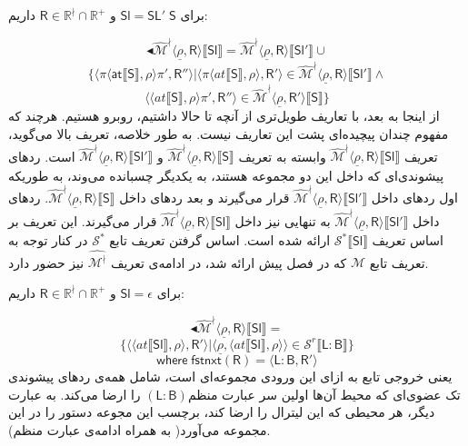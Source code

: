 برای $\mathsf{Sl=SL' \; S}$ و $\mathsf{R} \in \mathbb{R^\nmid} \cap \mathbb{R^+}$ داریم:

$$\blacktriangleleft\mathcal{\hat{M}^\nmid} \langle \underline{\rho}, \mathsf{R} \rangle \llbracket \mathsf{Sl} \rrbracket
=
\mathcal{\hat{M}^\nmid} \langle \underline{\rho}, \mathsf{R} \rangle \llbracket \mathsf{Sl'} \rrbracket
\cup$$ 
$$\{ \langle \pi \langle \mathsf{at}\llbracket \mathsf{S} \rrbracket, \rho \rangle \pi'
, \mathsf{R''} \rangle | \langle \pi \langle at \llbracket \mathsf{S}\rrbracket, \rho \rangle, \mathsf{R'} \rangle \in \mathcal{\hat{M}^\nmid}  \langle \underline{\rho} , \mathsf{R} \rangle \llbracket \mathsf{Sl'} \rrbracket\land$$
 $$\langle \langle at \llbracket \mathsf{S}\rrbracket , \rho \rangle \pi' , \mathsf{R''} \rangle \in \mathcal{\hat{M}^\nmid}
\langle \underline{\rho},\mathsf{R'} \rangle   \llbracket \mathsf{S} \rrbracket
 \}$$
از اینجا به بعد، با تعاریف طویل‌تری از آنچه تا حالا داشتیم، روبرو هستیم. هرچند که مفهوم چندان پیچیده‌ای پشت این تعاریف نیست. به ‌طور خلاصه، تعریف بالا می‌گوید، تعریف 
$\mathcal{\hat{M}^\nmid} \langle \underline{\rho}, \mathsf{R} \rangle \llbracket \mathsf{Sl} \rrbracket$
وابسته به تعریف 
$\mathcal{\hat{M}^\nmid} \langle \underline{\rho}, \mathsf{R} \rangle \llbracket \mathsf{S} \rrbracket$
و
$\mathcal{\hat{M}^\nmid} \langle \underline{\rho}, \mathsf{R} \rangle \llbracket \mathsf{Sl'} \rrbracket$
است. ردهای پیشوندی‌ای که داخل این دو مجموعه هستند، به یکدیگر چسبانده می‌وند، به‌ طوریکه اول ردهای داخل 
$\mathcal{\hat{M}^\nmid} \langle \underline{\rho}, \mathsf{R} \rangle \llbracket \mathsf{Sl'} \rrbracket$
قرار می‌گیرند و بعد ردهای داخل 
$\mathcal{\hat{M}^\nmid} \langle \underline{\rho}, \mathsf{R} \rangle \llbracket \mathsf{S} \rrbracket$.
ردهای داخل 
$\mathcal{\hat{M}^\nmid} \langle \underline{\rho}, \mathsf{R} \rangle \llbracket \mathsf{Sl'} \rrbracket$
به تنهایی نیز داخل 
$\mathcal{\hat{M}^\nmid} \langle \underline{\rho}, \mathsf{R} \rangle \llbracket \mathsf{Sl} \rrbracket$
قرار می‌گیرند. این تعریف بر اساس تعریف 
$\mathcal{S}^* \llbracket \mathsf{Sl} \rrbracket$
ارائه شده است. اساس گرفتن تعریف تابع 
$\mathcal{S}^*$
در کنار توجه به تعریف تابع 
$\mathcal{M}$
که در فصل پیش ارائه شد، در ادامه‌ی تعریف 
$\mathcal{\hat{M^\nmid}}$
	 نیز حضور دارد.

برای $\mathsf{Sl=\epsilon}$ و $\mathsf{R} \in \mathbb{R^\nmid} \cap \mathbb{R^+}$ داریم:

$$\blacktriangleleft\mathcal{\hat{M}^\nmid} \langle \underline{\rho}, \mathsf{R} \rangle \llbracket \mathsf{Sl} \rrbracket
=$$
$$\{ \langle \langle at \llbracket \mathsf{Sl} \rrbracket , \rho \rangle , \mathsf{R'} \rangle | \langle \underline{\rho} , \langle at \llbracket \mathsf{Sl} \rrbracket, \rho \rangle \rangle \in \mathcal{S}^r \llbracket \mathsf{L:B} \rrbracket
\}$$
$$\mathsf{where \; fstnxt(R)=\langle L:B,R' \rangle}$$
یعنی خروجی تابع به ازای این ورودی مجموعه‌ای است، شامل همه‌ی ردهای پیشوندی تک عضوی‌ای که محیط آن‌ها اولین سر عبارت منظم$(\mathsf{L:B})$ را ارضا می‌کند. به عبارت دیگر، هر محیطی که این لیترال را ارضا کند، برچسب این مجوعه دستور را در این مجموعه می‌آورد( به همراه ادامه‌ی عبارت منظم).

